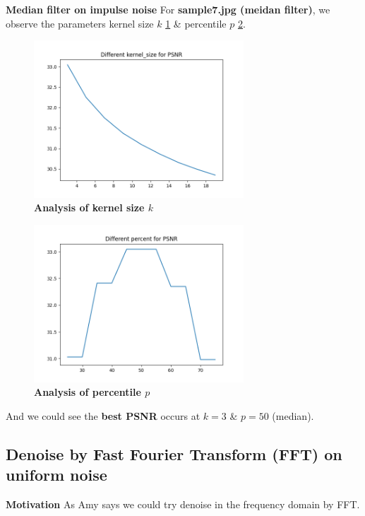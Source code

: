 \textbf{Median filter on impulse noise}
For \textbf{sample7.jpg (meidan filter)}, we observe the parameters kernel size $k$ \cref{fig3_7k} \& percentile $p$ \cref{fig3_7p}.
\begin{figure}
  \centering
  \includegraphics[width=0.7\textwidth]{image/sample7_paramkernel_size.png}
  \caption{\textbf{Analysis of kernel size $k$}}
  \label{fig3_7k}
\end{figure}
\begin{figure}
  \centering
  \includegraphics[width=0.7\textwidth]{image/sample7_parampercent.png}
  \caption{\textbf{Analysis of percentile $p$}}
  \label{fig3_7p}
\end{figure}
And we could see the \textbf{best PSNR} occurs at $k=3$ \& $p=50$ (median).

\subsection{Denoise by Fast Fourier Transform (FFT) on uniform noise}

\textbf{Motivation}
As Amy says we could try denoise in the frequency domain by FFT.

